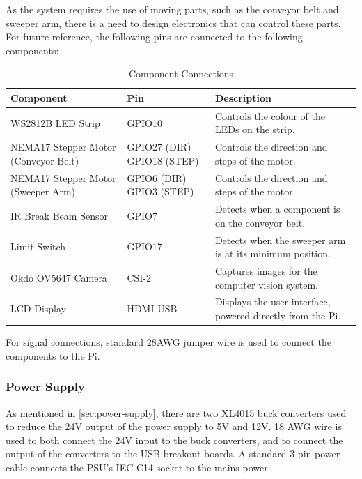 As the system requires the use of moving parts, such as the conveyor belt and sweeper arm, there is a need to design electronics that can control these parts. For future reference, the following pins are connected to the following components:

\begin{table}[H]
    \centering
    {\fontsize{10pt}{12pt}\selectfont
    \begin{tabularx}{\textwidth}{|p{4cm}|p{4cm}|X|}
        \hline
        \textbf{Component} & \textbf{Pin} & \textbf{Description} \\
        \hline
        WS2812B LED Strip & GPIO10 & Controls the colour of the LEDs on the strip. \\
        \hline
        NEMA17 Stepper Motor (Conveyor Belt) & GPIO27 (DIR) \newline GPIO18 (STEP) & Controls the direction and steps of the motor. \\
        \hline
        NEMA17 Stepper Motor (Sweeper Arm) & GPIO6 (DIR) \newline GPIO3 (STEP) & Controls the direction and steps of the motor. \\
        \hline
        IR Break Beam Sensor & GPIO7 & Detects when a component is on the conveyor belt. \\
        \hline
        Limit Switch & GPIO17 & Detects when the sweeper arm is at its minimum position. \\
        \hline
        Okdo OV5647 Camera & CSI-2 & Captures images for the computer vision system. \\
        \hline
        LCD Display & HDMI \newline USB & Displays the user interface, powered directly from the Pi. \\
        \hline
    \end{tabularx}
    }
    \caption{Component Connections}
    \label{tab:component-connections}
\end{table}

For signal connections, standard 28AWG jumper wire is used to connect the components to the Pi.
\subsubsection{Power Supply}

As mentioned in \autoref{sec:power-supply}, there are two XL4015 buck converters used to reduce the 24V output of the power supply to 5V and 12V. 18 AWG wire is used to both connect the 24V input to the buck converters, and to connect the output of the converters to the USB breakout boards. A standard 3-pin power cable connects the PSU's IEC C14 socket to the mains power.
